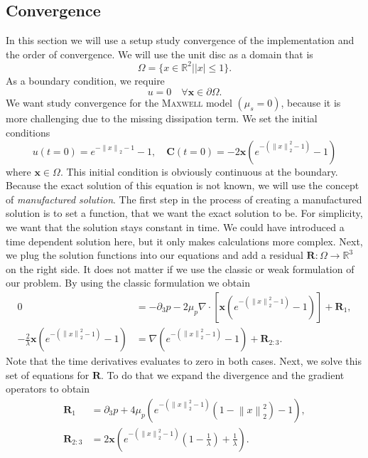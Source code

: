 \documentclass[12pt,a4paper,twoside, open=right]{scrreprt}
\theoremstyle{definition}
\theoremstyle{plain}
\newcommand{\abs}[1]{\left\vert #1\right\vert}
\newcommand{\rr}{\mathbb{R}}
\newcommand{\norm}[1]{\left\lVert#1\right\rVert}
\newcommand{\bfC}{\bm{C}}
\newcommand{\bfx}{\bm{x}}
\newcommand{\bfR}{\bm{R}}
\begin{document}
\subsection{Convergence}
In this section we will use a setup study convergence of the implementation and the order of convergence. We will use the unit disc as a domain that is
\begin{equation}
    \Omega =\{x\in\rr^2|\abs{x}\le 1\}.
\end{equation} 
As a boundary condition, we require
\begin{equation}
u = 0\quad\forall\bfx\in\partial\Omega.
\end{equation}
We want study convergence for the \textsc{Maxwell} model $(\mu_s=0)$, because it is more challenging due to the missing dissipation term.
We set the initial conditions
\begin{equation}
u(t=0) = e^{-\norm{x}_2-1}-1,
\quad\bfC(t=0) = -2\bfx(e^{-(\norm{x}_2^2 -1)}-1)
\end{equation}
where $\bfx\in\Omega$. This initial condition is obviously continuous at the boundary. Because the exact solution of this equation is not known, we will use the concept of \emph{manufactured solution}. The first step in the process of creating a manufactured solution is to set a function, that we want the exact solution to be. For simplicity, we want that the solution stays constant in time.  We could have introduced a time dependent solution here, but it only makes calculations more complex. Next, we plug the solution functions into our equations and add a residual $\bfR\colon\Omega\to\rr^3$ on the right side. It does not matter if we use the classic or weak formulation of our problem. By using the classic formulation we obtain
\begin{align}
0 &= -\partial_3 p-2\mu_p \nabla\cdot [\bfx(e^{-(\norm{x}_2^2 -1)}-1)] +\bfR_1,\\
-\frac{2}{\lambda}\bfx(e^{-(\norm{x}_2^2 -1)}-1)&= \nabla (e^{-(\norm{x}_2^2 -1)}-1) +\bfR_{2:3}.
\end{align}
Note that the time derivatives evaluates to zero in both cases. Next, we solve this set of equations for $\bfR$. To do that we expand the divergence and the gradient operators to obtain
\begin{align}
\bfR_1 &= \partial_3 p +4\mu_p(e^{-(\norm{x}_2^2 -1)}(1-\norm{x}_2^2)-1),\\
\bfR_{2:3} &=2\bfx\left(e^{-(\norm{x}_2^2 -1)}\left(1-\frac{1}{\lambda}\right)+\frac{1}{\lambda}\right).
\end{align}
\end{document}
